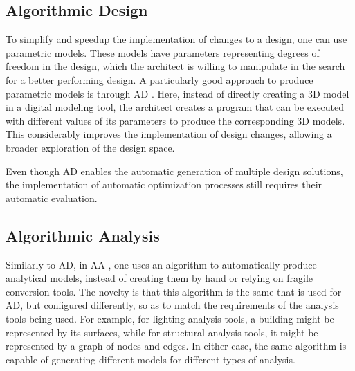 	
	
	\subsection{Algorithmic Design}
	To simplify and speedup the implementation of changes to a design, one can use parametric models. These models have parameters representing degrees of freedom in the design, which the architect is willing to manipulate in the search for a better performing design. A particularly good approach to produce parametric models is through \ac{AD} \cite{Terzidis2006}. Here, instead of directly creating a 3D model in a digital modeling tool, the architect creates a program that can be executed with different values of its parameters to produce the corresponding 3D models. This considerably improves the implementation of design changes, allowing a broader exploration of the design space.
	
	Even though \ac{AD} enables the automatic generation of multiple design solutions, the implementation of automatic optimization processes still requires their automatic evaluation.
	
	\subsection{Algorithmic Analysis}
	Similarly to \ac{AD}, in \ac{AA} \cite{Aguiar2017}, one uses an algorithm to automatically produce analytical models, instead of creating them by hand or relying on fragile conversion tools. The novelty is that this algorithm is the same that is used for \ac{AD}, but configured differently, so as to match the requirements of the analysis tools being used. For example, for lighting analysis tools, a building might be represented by its surfaces, while for structural analysis tools, it might be represented by a graph of nodes and edges. In either case, the same algorithm is capable of generating different models for different types of analysis.
	
